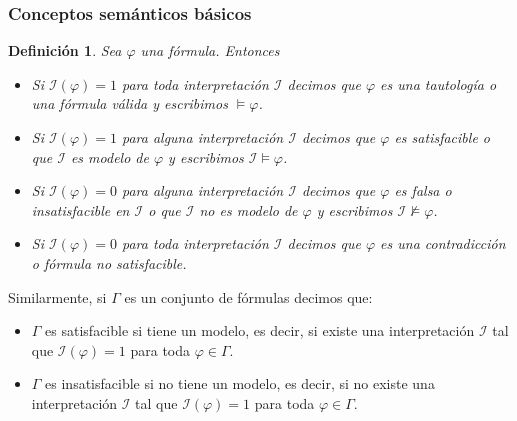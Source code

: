 \documentclass[letterpaper,12pt]{article}
\newtheorem{define}{Definición}[]
\begin{document}
    \subsubsection{Conceptos semánticos básicos}
    \begin{define}
        Sea $\varphi$ una fórmula. Entonces 
        \begin{itemize}
            \item Si $\mathcal{I}(\varphi) = 1$ para toda interpretación 
            $\mathcal{I}$ decimos que $\varphi$ es una tautología o una 
            fórmula válida y escribimos $\models \varphi$. 
            \item Si $\mathcal{I}(\varphi) = 1$ para alguna interpretación
            $\mathcal{I}$ decimos que $\varphi$ es satisfacible o que
            $\mathcal{I}$ es modelo de $\varphi$ y escribimos 
            $\mathcal{I} \models \varphi$.
            \item Si $\mathcal{I}(\varphi) = 0$ para alguna interpretación
            $\mathcal{I}$ decimos que $\varphi$ es falsa o insatisfacible
            en $\mathcal{I}$ o que $\mathcal{I}$ no es modelo de $\varphi$
            y escribimos $\mathcal{I} \not \models \varphi$.
            \item Si $\mathcal{I}(\varphi) = 0$ para toda interpretación
            $\mathcal{I}$ decimos que $\varphi$ es una contradicción o fórmula
            no satisfacible. 
        \end{itemize}
    \end{define}

    \justify
    Similarmente, si $\Gamma$ es un conjunto de fórmulas decimos que:
    \begin{itemize}
        \item $\Gamma$ es satisfacible si tiene un modelo, es decir, si existe
        una interpretación $\mathcal{I}$ tal que $\mathcal{I}(\varphi) = 1$
        para toda $\varphi \in \Gamma$.
        \item $\Gamma$ es insatisfacible si no tiene un modelo, es decir, si 
        no existe una interpretación $\mathcal{I}$ tal que 
        $\mathcal{I}(\varphi) = 1$ para toda $\varphi \in \Gamma$.
    \end{itemize}
\end{document}
